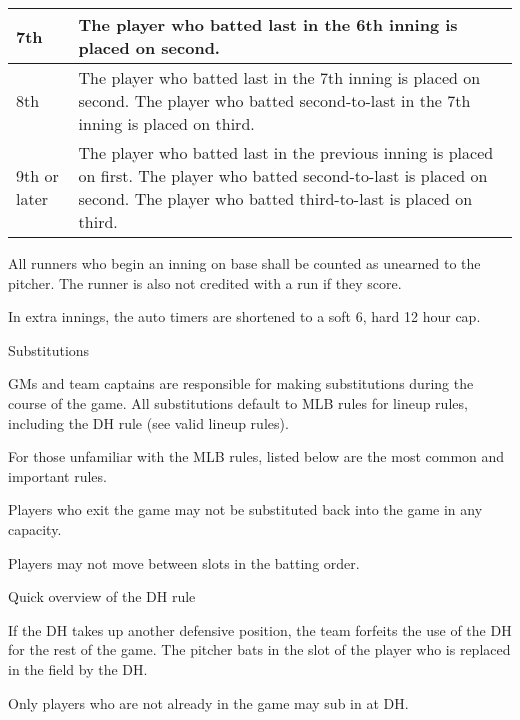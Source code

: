 \begin{deepEnumerate}
\begin{deepEnumerate}
\begin{deepEnumerate}
\begin{center}
\begin{longtable}{|p{3cm}|p{8cm}|}
					\hline
					7th             & The player who batted last in the 6th inning is placed on second.     \\
					\hline
					8th             & The player who batted last in the 7th inning is placed on second.     
					The player who batted second-to-last in the 7th inning is placed on third. \\
					\hline
					9th or later    & The player who batted last in the previous inning is placed on first. 
					The player who batted second-to-last is placed on second.
					The player who batted third-to-last is placed on third. \\
					\hline
				\end{longtable}
			\end{center}
			\item All runners who begin an inning on base shall be counted as unearned to the pitcher. 
			The runner is also not credited with a run if they score.
			\item In extra innings, the auto timers are shortened to a soft 6, hard 12 hour cap.
		\end{deepEnumerate}
	\end{deepEnumerate}
	\item Substitutions
	\label{sec:substitutions}
	\begin{deepEnumerate}
		\item GMs and team captains are responsible for making substitutions during the course of the game.
		All substitutions default to MLB rules for lineup rules, including the DH rule (see valid lineup rules).
		\begin{deepEnumerate}
			\item For those unfamiliar with the MLB rules, listed below are the most common and important rules.
			\begin{deepEnumerate}
				\item Players who exit the game may not be substituted back into the game in any capacity.
				\item Players may not move between slots in the batting order.
				\item Quick overview of the DH rule
				\begin{deepEnumerate}
					\item If the DH takes up another defensive position, the team forfeits the use of the DH for the rest of the game. 
					The pitcher bats in the slot of the player who is replaced in the field by the DH.
					\item Only players who are not already in the game may sub in at DH.

\end{deepEnumerate}
\end{deepEnumerate}
\end{deepEnumerate}
\end{deepEnumerate}
\end{deepEnumerate}
